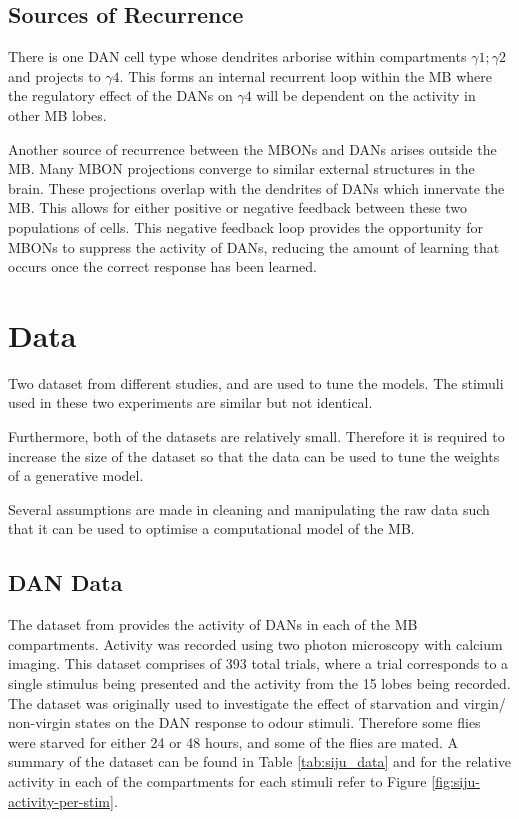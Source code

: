 \documentclass[11pt, A4]{article}
\begin{document}
\begin{multicols}{2}
\subsection{Sources of Recurrence}

There is one DAN cell type whose dendrites arborise within compartments $\gamma1; \gamma2$ and projects to $\gamma4$. This forms an internal recurrent loop within the MB where the regulatory effect of the DANs on  $\gamma4$ will be dependent on the activity in other MB lobes.

Another source of recurrence between the MBONs and DANs arises outside the MB. Many MBON projections converge to similar external structures in the brain. These projections overlap with the dendrites of DANs which innervate the MB. This allows for either positive or negative feedback between these two populations of cells. This negative feedback loop provides the opportunity for MBONs to suppress the activity of DANs, reducing the amount of learning that occurs once the correct response has been learned.

\section{Data}
Two dataset from different studies,  \cite{siju2020} and  \cite{hige2015} are used to tune the models. The stimuli used in these two experiments are similar but not identical. 

Furthermore, both of the datasets are relatively small. Therefore it is required to increase the size of the dataset so that the data can be used to tune the weights of a generative model.

Several assumptions are made in cleaning and manipulating the raw data such that it can be used to optimise a computational model of the MB. 

\subsection{DAN Data}
The dataset from  \cite{siju2020} provides the activity of DANs in each of the MB compartments. Activity was recorded using two photon microscopy with calcium imaging. This dataset comprises of 393 total trials, where a trial corresponds to a single stimulus being presented and the activity from the 15 lobes being recorded.  The dataset was originally used to investigate the effect of starvation and virgin/ non-virgin states on the DAN response to odour stimuli. Therefore some flies were starved for either 24 or 48 hours, and some of the flies are mated. A summary of the dataset can be found in Table \ref{tab:siju_data} and for the relative activity in each of the compartments for each stimuli refer to Figure \ref{fig:siju-activity-per-stim}.




\end{multicols}
\end{document}
